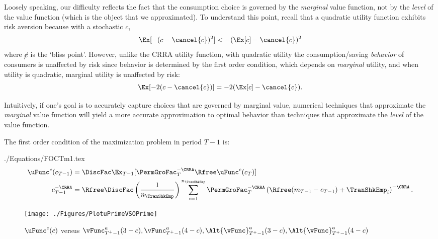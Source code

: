 \documentclass[titlepage, headings=optiontotocandhead]{\econtex}
\begin{document}
Loosely speaking, our difficulty reflects the fact that the
consumption choice is governed by the \textit{marginal} value function,
not by the \textit{level} of the value function (which is the object that
we approximated).  To understand this point, recall that a quadratic
utility function exhibits
risk aversion because with a stochastic ${c}$,
\begin{equation}
  \Ex[-({c} - \cancel{c})^{2}] < - (\Ex[{c}] - \cancel{c})^{2}
\end{equation}
where $\cancel{c}$ is the `bliss point'. However, unlike the CRRA utility function,
with quadratic utility the consumption/saving \textit{behavior} of consumers
is unaffected by risk since behavior is determined by the first order condition, which
depends on \textit{marginal} utility, and when utility is quadratic, marginal utility is unaffected
by risk:
\begin{equation}
  \Ex[-2({c} - \cancel{c})] = - 2(\Ex[{c}] - \cancel{c}).
\end{equation}

Intuitively, if one's goal is to accurately capture choices
that are governed by marginal value,
numerical techniques that approximate the \textit{marginal} value
function will yield a more accurate approximation to
optimal behavior than techniques that approximate the \textit{level}
of the value function.

The first order condition of the maximization problem in period $T-1$ is:
\begin{verbatimwrite}{./Equations/FOCTm1.tex}
  \begin{equation}\begin{gathered}\begin{aligned}
        \uFunc^{{c}}({c}_{T-1})       & = \DiscFac \Ex_{T-1} [\PermGroFac_{T}^{-\CRRA}\Rfree \uFunc^{{c}}({c}_{T})]  %
        \\      {c}_{T-1}^{-\CRRA}   & = \Rfree \DiscFac \left(\frac{1}{n_{\TranShkEmp}}\right) \sum_{i=1}^{n_{\TranShkEmp}} \PermGroFac_{T}^{-\CRRA}\left(\Rfree ({m}_{T-1}-{c}_{T-1}) + \TranShkEmp_{i}\right)^{-\CRRA} \label{eq:FOCTm1}.
      \end{aligned}\end{gathered}\end{equation}
\end{verbatimwrite}
\unskip
{}
\hypertarget{PlotuPrimeVSOPrime}{}
\begin{figure}
  \centerline{\texttt{[image: ./Figures/PlotuPrimeVSOPrime]}}
  \caption{$\uFunc^{{c}}(c)$ versus $\vFunc_{T^{+}-1}^{{a}}(3-c), \vFunc_{T^{+}-1}^{{a}}(4-c), \Alt{\vFunc}_{T^{+}-1}^{{a}}(3-c), \Alt{\vFunc}_{T^{+}-1}^{{a}}(4-c)$}
  \label{fig:PlotuPrimeVSOPrime}
\end{figure}
\end{document}
